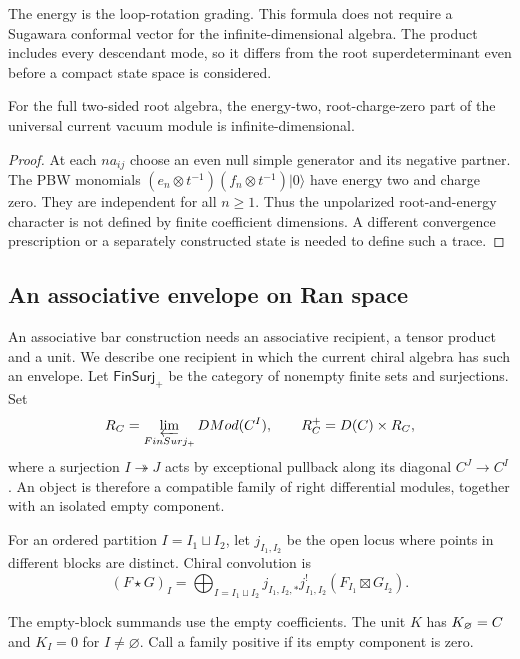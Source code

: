 The energy
is the loop-rotation grading. This formula does not require a
Sugawara conformal vector for the infinite-dimensional algebra.
The product includes every descendant mode, so it differs from the
root superdeterminant even before a compact state space is considered.

\begin{proposition}
\label{prop:bkm-current-infinite-charge-zero}
For the full two-sided root algebra, the energy-two, root-charge-zero
part of the universal current vacuum module is infinite-dimensional.
\end{proposition}
\begin{proof}
At each $na_{ij}$ choose an even null simple generator and its
negative partner. The PBW monomials
$(e_n\otimes t^{-1})(f_n\otimes t^{-1})|0\rangle$ have energy
two and charge zero. They are independent for all $n\geq1$.
Thus the unpolarized root-and-energy character is not defined by
finite coefficient dimensions. A different convergence prescription
or a separately constructed state is needed to define such a trace.
\end{proof}

\subsection{An associative envelope on Ran space}
\label{sec:bkm-ran-envelope}

An associative bar construction needs an associative recipient,
a tensor product and a unit. We describe one recipient in which
the current chiral algebra has such an envelope.
Let $\mathsf{FinSurj}_+$ be the category of nonempty finite sets
and surjections. Set
\[
 R_C=\varprojlim_{FinSurj_+}DMod(C^I),
 \qquad R_C^+=D(C)\times R_C,
\]
where a surjection $I\twoheadrightarrow J$ acts by exceptional
pullback along its diagonal $C^J\to C^I$.
An object is therefore a compatible family of right differential
modules, together with an isolated empty component.

For an ordered
partition $I=I_1\sqcup I_2$, let $j_{I_1,I_2}$ be the open locus
where points in different blocks are distinct. Chiral convolution is
\[
 (F\star G)_I=
 \bigoplus_{I=I_1\sqcup I_2}
  j_{I_1,I_2,*}j_{I_1,I_2}^{!}(F_{I_1}\boxtimes G_{I_2}).
\]

The empty-block summands use the empty coefficients. The unit $K$
has $K_\varnothing=C$ and $K_I=0$ for $I\ne\varnothing$.
Call a family positive if its empty component is zero.


